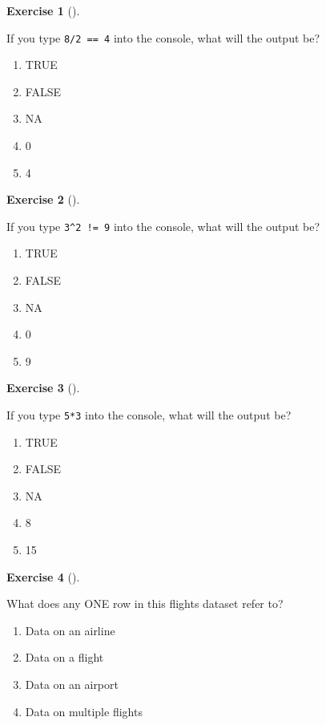 \documentclass[
  letterpaper,
  DIV=11,
  numbers=noendperiod]{scrreprt}
\providecommand{\tightlist}{%
  \setlength{\itemsep}{0pt}\setlength{\parskip}{0pt}}\usepackage{longtable,booktabs,array}
\theoremstyle{definition}
\newtheorem{exercise}{Exercise}[chapter]
\theoremstyle{remark}
\begin{document}
\begin{exercise}[]\protect\hypertarget{exr-ch01-c04}{}\label{exr-ch01-c04}

If you type \texttt{8/2\ ==\ 4} into the console, what will the output
be?

\begin{enumerate}
\def\labelenumi{\alph{enumi})}
\tightlist
\item
  TRUE
\item
  FALSE
\item
  NA
\item
  0
\item
  4
\end{enumerate}

\end{exercise}

\begin{exercise}[]\protect\hypertarget{exr-ch01-c05}{}\label{exr-ch01-c05}

If you type \texttt{3\^{}2\ !=\ 9} into the console, what will the
output be?

\begin{enumerate}
\def\labelenumi{\alph{enumi})}
\tightlist
\item
  TRUE
\item
  FALSE
\item
  NA
\item
  0
\item
  9
\end{enumerate}

\end{exercise}

\begin{exercise}[]\protect\hypertarget{exr-ch01-c06}{}\label{exr-ch01-c06}

If you type \texttt{5*3} into the console, what will the output be?

\begin{enumerate}
\def\labelenumi{\alph{enumi})}
\tightlist
\item
  TRUE
\item
  FALSE
\item
  NA
\item
  8
\item
  15
\end{enumerate}

\end{exercise}

\begin{exercise}[]\protect\hypertarget{exr-ch01-c07}{}\label{exr-ch01-c07}

What does any ONE row in this flights dataset refer to?

\begin{enumerate}
\def\labelenumi{\alph{enumi})}
\tightlist
\item
  Data on an airline
\item
  Data on a flight
\item
  Data on an airport
\item
  Data on multiple flights
\end{enumerate}

\end{exercise}
\end{document}
